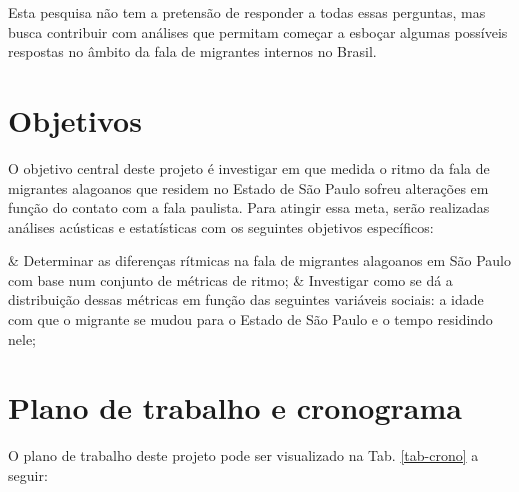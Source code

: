 \documentclass[
	a4paper,	%
	12pt,		%
	]{article}	%
\begin{document}
	Esta pesquisa não tem a pretensão de responder a todas essas perguntas, mas
	busca contribuir com análises que permitam começar a esboçar algumas
	possíveis respostas no âmbito da fala de migrantes internos no Brasil.

\section{Objetivos} \label{objetivos}

O objetivo central deste projeto é investigar em que medida o ritmo da fala
de migrantes alagoanos que residem no Estado de São Paulo sofreu alterações
em função do contato com a fala paulista. Para atingir essa meta, serão
realizadas análises acústicas e estatísticas com os seguintes objetivos
específicos:

\begin{easylist}[enumerate]
	& Determinar as diferenças rítmicas na fala de migrantes alagoanos em
	São Paulo com base num conjunto de métricas de ritmo;
	& Investigar como se dá a distribuição dessas métricas em função das
	seguintes variáveis sociais: a idade com que o migrante se mudou para o
	Estado de São Paulo e o tempo residindo nele;
\end{easylist}

\section{Plano de trabalho e cronograma} \label{plano}

O plano de trabalho deste projeto pode ser visualizado na Tab.
\ref{tab-crono} a seguir:
\end{document}
